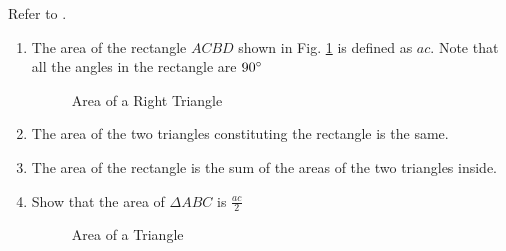 Refer to .
\begin{enumerate}[label=\thesection.\arabic*.,ref=\thesection.\theenumi]
%
\item
	The area of the rectangle $ACBD$ shown in Fig. \ref{fig:tri_rect} is defined as $ac$. Note that all the angles in the rectangle are $90\degree$

\begin{figure}[!ht]
	\begin{center}
		
		\resizebox{\columnwidth}{!}{}
	\end{center}
	\caption{Area of a Right Triangle}
	\label{fig:tri_rect}	
\end{figure}
%
\iffalse
\item Draw Fig. \ref{fig:tri_rect} for $a = 4, c =3$.
\label{const:tri_rect}
\\
\solution Letting
%
\begin{align}
\vec{B} = \myvec{0 \\  0}, 
\vec{D} = \myvec{4 \\  3} 
\label{eq:tri_rect}
\end{align}
%
the python code for  Fig. \ref{fig:tri_rect} is
\begin{lstlisting}
codes/triangle/tri_rect.py
\end{lstlisting}
%
and the equivalent latex-tikz code is
%
\begin{lstlisting}
figs/triangle/tri_rect.tex
\end{lstlisting}
\fi

\item
	The area of the two triangles constituting the rectangle is the same.
	\label{ch2_triang_eq}

\item
	The area of the rectangle is the sum of the areas of the two triangles inside.
	\label{ch2_triang_sum}


\item
\label{prob:ch2_triang_area}
	Show that the area of $\Delta ABC$ is $\frac{ac}{2}$

\begin{figure}[!ht]
	\begin{center}
			\resizebox{\columnwidth}{!}{}
	\end{center}
	\caption{Area of a Triangle}
	\label{fig:tri_sss}	
\end{figure}


\end{enumerate}

